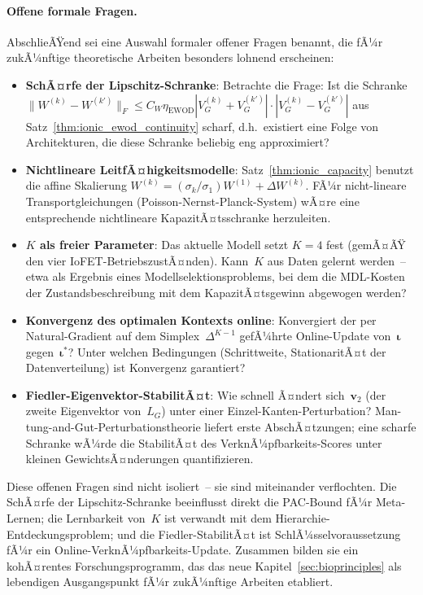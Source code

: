﻿\documentclass[12pt, a4paper, openany]{report}
\begin{document}
\paragraph{Offene formale Fragen.}
AbschlieÃŸend sei eine Auswahl formaler offener Fragen benannt, die fÃ¼r
zukÃ¼nftige theoretische Arbeiten besonders lohnend erscheinen:
\begin{itemize}
  \item \textbf{SchÃ¤rfe der Lipschitz-Schranke}: Betrachte die Frage: Ist die Schranke
    $\|W^{(k)} - W^{(k')}\|_F \leq C_W \eta_{\text{EWOD}}
    |V_G^{(k)} + V_G^{(k')}| \cdot |V_G^{(k)} - V_G^{(k')}|$
    aus Satz~\ref{thm:ionic_ewod_continuity} scharf, d.h.\ existiert eine
    Folge von Architekturen, die diese Schranke beliebig eng approximiert?
  \item \textbf{Nichtlineare LeitfÃ¤higkeitsmodelle}: Satz~\ref{thm:ionic_capacity}
    benutzt die affine Skalierung $W^{(k)} = (\sigma_k/\sigma_1) W^{(1)} + \Delta W^{(k)}$.
    FÃ¼r nicht-lineare Transportgleichungen (Poisson-Nernst-Planck-System) wÃ¤re
    eine entsprechende nichtlineare KapazitÃ¤tsschranke herzuleiten.
  \item \textbf{$K$ als freier Parameter}: Das aktuelle Modell setzt $K=4$
    fest (gemÃ¤ÃŸ den vier IoFET-BetriebszustÃ¤nden). Kann~$K$ aus Daten gelernt
    werden~-- etwa als Ergebnis eines Modellselektionsproblems, bei dem die
    MDL-Kosten der Zustandsbeschreibung mit dem KapazitÃ¤tsgewinn abgewogen werden?
  \item \textbf{Konvergenz des optimalen Kontexts online}: Konvergiert
    der per Natural-Gradient auf dem Simplex~$\Delta^{K-1}$ gefÃ¼hrte
    Online-Update von~$\bm{\iota}$ gegen~$\bm{\iota}^*$?  Unter welchen
    Bedingungen (Schrittweite, StationaritÃ¤t der Datenverteilung) ist
    Konvergenz garantiert?
  \item \textbf{Fiedler-Eigenvektor-StabilitÃ¤t}: Wie schnell Ã¤ndert sich~$\bm{v}_2$
    (der zweite Eigenvektor von~$L_G$) unter einer Einzel-Kanten-Perturbation?
    Man-tung-and-Gut-Perturbations\-theorie \cite{chung97} liefert erste
    AbschÃ¤tzungen; eine scharfe Schranke wÃ¼rde die StabilitÃ¤t des
    VerknÃ¼pfbarkeits-Scores unter kleinen GewichtsÃ¤nderungen quantifizieren.
\end{itemize}
Diese offenen Fragen sind nicht isoliert~-- sie sind miteinander verflochten.
Die SchÃ¤rfe der Lipschitz-Schranke beeinflusst direkt die PAC-Bound fÃ¼r
Meta-Lernen; die Lernbarkeit von~$K$ ist verwandt mit dem Hierarchie-Entdeckungs\-problem;
und die Fiedler-StabilitÃ¤t ist SchlÃ¼sselvoraussetzung fÃ¼r ein
Online-VerknÃ¼pfbarkeits-Update.  Zusammen bilden sie ein kohÃ¤rentes
Forschungsprogramm, das das neue Kapitel~\ref{sec:bioprinciples} als
lebendigen Ausgangspunkt fÃ¼r zukÃ¼nftige Arbeiten etabliert.
\end{document}
